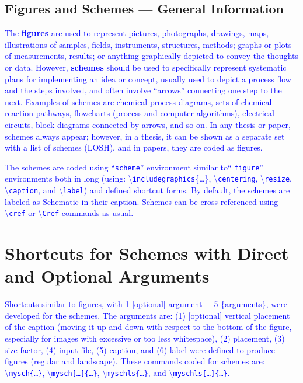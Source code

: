 \documentclass[phd,showframe]{ndsu-thesis-2022}
\newcommand\italk[1]{\textcolor{blue}{#1}}  %
\newcommand\cmd[1]{\textbackslash\texttt{#1}}  %
\begin{document}
\subsection{Figures and Schemes --- General Information}\label{figs}

\italk{The \textbf{figures} are used to represent pictures, photographs, drawings, maps, illustrations of samples, fields, instruments, structures, methods; graphs or plots of measurements, results; or anything graphically depicted to convey the thoughts or data. However, \textbf{schemes} should be used to specifically represent systematic plans for implementing an idea or concept, usually used to depict a process flow and the steps involved, and often involve ``arrows'' connecting one step to the next. Examples of schemes are chemical process diagrams, sets of chemical reaction pathways, flowcharts (process and computer algorithms), electrical circuits, block diagrams connected by arrows, and so on. In any thesis or paper, schemes always appear; however, in a thesis, it can be shown as a separate set with a list of schemes (LOSH), and in papers, they are coded as figures.}

\italk{The schemes are coded using ``\texttt{scheme}'' environment similar to`` \texttt{figure}'' environments both in long (using: \cmd{includegraphics}\{\ldots\}, \cmd{centering}, \cmd{resize}, \cmd{caption}, and \cmd{label}) and defined shortcut forms.  By default, the schemes are labeled as Schematic in their caption. Schemes can be cross-referenced using \cmd{cref} or \cmd{Cref} commands as usual.} 

\section{Shortcuts for Schemes with Direct and Optional Arguments}

\italk{Shortcuts similar to figures, with 1 [optional] argument + 5 \{arguments\}, were developed for the schemes. The arguments are: (1) [optional] vertical placement of the caption (moving it up and down with respect to the bottom of the figure, especially for images with excessive or too less whitespace), (2) placement, (3) size factor, (4) input file, (5) caption, and (6) label were defined to produce figures (regular and landscape). These commands coded for schemes are: \cmd{mysch\{\ldots\}}, \cmd{mysch[\ldots]\{\ldots\}}, \cmd{myschls\{\ldots\}}, and \cmd{myschls[\ldots]\{\ldots\}}.}
\end{document}
